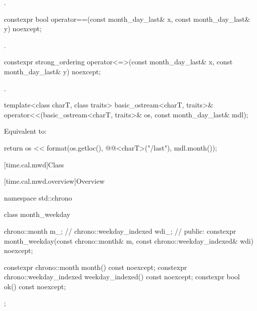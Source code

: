 \begin{itemdescr}
\pnum
\returns
{}.
\end{itemdescr}

%
\begin{itemdecl}
constexpr bool operator==(const month_day_last& x, const month_day_last& y) noexcept;
\end{itemdecl}

\begin{itemdescr}
\pnum
\returns
{}.
\end{itemdescr}

%
\begin{itemdecl}
constexpr strong_ordering operator<=>(const month_day_last& x, const month_day_last& y) noexcept;
\end{itemdecl}

\begin{itemdescr}
\pnum
\returns
{}.
\end{itemdescr}

%
\begin{itemdecl}
template<class charT, class traits>
  basic_ostream<charT, traits>&
    operator<<(basic_ostream<charT, traits>& os, const month_day_last& mdl);
\end{itemdecl}

\begin{itemdescr}
\pnum
\effects
Equivalent to:
\begin{codeblock}
return os << format(os.getloc(), @@<charT>("{}/last"), mdl.month());
\end{codeblock}
\end{itemdescr}

[time.cal.mwd]{Class }

[time.cal.mwd.overview]{Overview}

\begin{codeblock}
namespace std::chrono {
  class month_weekday {
    chrono::month           m_;         // \expos
    chrono::weekday_indexed wdi_;       // \expos
  public:
    constexpr month_weekday(const chrono::month& m, const chrono::weekday_indexed& wdi) noexcept;

    constexpr chrono::month           month()           const noexcept;
    constexpr chrono::weekday_indexed weekday_indexed() const noexcept;
    constexpr bool ok() const noexcept;
  };
}
\end{codeblock}


